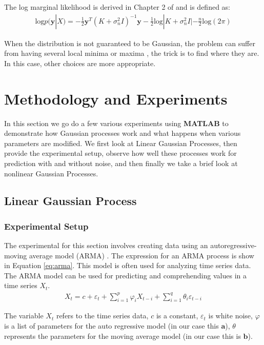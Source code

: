 \documentclass[11pt, twoside]{article}   	%
\begin{document}
The log marginal likelihood is derived in Chapter 2 of \cite{gauss_proc} and is defined 
as: 
\begin{align}
\text{log}p(\mathbf{y} | X) = -\frac{1}{2} \mathbf{y}^T (K + \sigma^2_n I )^{-1} \mathbf{y} - \frac{1}{2} \text{log}|K + \sigma^2_nI|
- \frac{n}{2} \text{log}(2\pi)
\end{align}

When the distribution is not guaranteed to be Gaussian, the problem can suffer from 
having several local minima or maxima \cite{gauss_proc}, the trick is to find where 
they are. In this case, other choices are more appropriate. 


\section{Methodology and Experiments}
In this section we go do a few various experiments using \textbf{MATLAB} to demonstrate how
Gaussian processes work and what happens when various parameters are modified. We first look
at Linear Gaussian Processes, then provide the experimental setup, observe how well these
processes work for prediction with and without noise, and then finally we take a brief look
at nonlinear Gaussian Processes. 
\subsection{Linear Gaussian Process}
\subsubsection{Experimental Setup}
The experimental for this section involves creating data using an autoregressive-moving average model (ARMA)
. The expression for an ARMA process is show in Equation \ref{eq:arma}. This model is often used for analyzing
time series data. The ARMA model can be used for predicting and comprehending values in a time series $X_t$. 
\begin{align}
X_t = c + \varepsilon_t + \sum_{i=1}^p \varphi_i X_{t-i} + \sum_{i=1}^q \theta_i \varepsilon_{t-i} \label{eq:arma}
\end{align}

The variable $X_t$ refers to the time series data, $c$ is a constant, $\varepsilon_t$ is white noise, $\varphi$ is a
list of  parameters for the auto regressive model (in our case this $\mathbf{a}$), $\theta$ represents the parameters 
for the moving average model (in our case this is $\mathbf{b}$).
\end{document}

